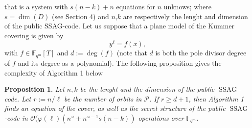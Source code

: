 \documentclass[10pt]{article}
\newtheorem{prop1}[thm]{Proposition}
\theoremstyle{definition}
\theoremstyle{definition}
\theoremstyle{definition}
\newcommand{\s}{\vspace{0.3cm}}
\newcommand{\calO}{\mathcal{O}}
\newcommand{\fqm}{\mathbb{F}_{q^m}}
\newcommand{\w}{\omega}
\newcommand{\PR}{\mathcal{P}}
\newcommand{\ssag}{\operatorname{SSAG}}
\begin{document}
that is a system with $s(n-k)+n$ equations for $n$ unknows; where $s=\dim(D)$ (see Section 4) and $n$,$k$ are respectively the lenght and dimension of the public SSAG-code. Let us suppose that a plane model of the Kummer covering is given by 
\[y^{\ell} = f(x),\]
with $f \in \fqm[T]$ and \color{purple} $d:=\deg(f)$ (note that $d$ is both the pole divisor degree of $f$ and its degree as a polynomial). \color{black}
The following proposition gives the complexity of Algorithm 1 below

\s

\begin{prop1} Let $n,k$ be the lenght and the dimension of the public $\ssag$-code. Let $r := n/\ell$ be the number of orbits in $\PR$. If $r \geq d+1$, then Algorithm 1 finds an equation of the cover, as well as the secret structure of the public $\ssag$-code in $\calO(\varphi(\ell)(n^{\w}+n^{\w-1}s(n-k))$ operations over $\fqm$. 

\end{prop1}

\s
\end{document}
